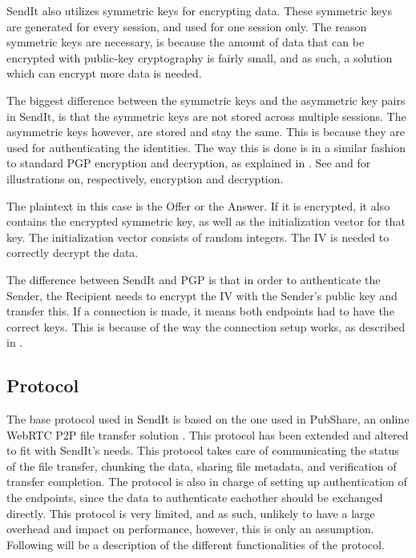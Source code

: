 	SendIt also utilizes symmetric keys for encrypting data. These symmetric keys are generated for every session, and used for one session only. The reason symmetric keys are necessary, is because the amount of data that can be encrypted with public-key cryptography is fairly small, and as such, a solution which can encrypt more data is needed.

	The biggest difference between the symmetric keys and the asymmetric key pairs in SendIt, is that the symmetric keys are not stored across multiple sessions. The asymmetric keys however, are stored and stay the same. This is because they are used for authenticating the identities. The way this is done is in a similar fashion to standard PGP encryption and decryption, as explained in . See  and  for illustrations on, respectively, encryption and decryption.

	The plaintext in this case is the Offer or the Answer. If it is encrypted, it also contains the encrypted symmetric key, as well as the initialization vector for that key. The initialization vector consists of random integers. The IV is needed to correctly decrypt the data. 

	The difference between SendIt and PGP is that in order to authenticate the Sender, the Recipient needs to encrypt the IV with the Sender's public key and transfer this. If a connection is made, it means both endpoints had to have the correct keys. This is because of the way the connection setup works, as described in .

	\subsection{Protocol}
	The base protocol used in SendIt is based on the one used in PubShare, an online WebRTC P2P file transfer solution \cite{url_pubshare}. This protocol has been extended and altered to fit with SendIt's needs. This protocol takes care of communicating the status of the file transfer, chunking the data, sharing file metadata, and verification of transfer completion. The protocol is also in charge of setting up authentication of the endpoints, since the data to authenticate eachother should be exchanged directly. This protocol is very limited, and as such, unlikely to have a large overhead and impact on performance, however, this is only an assumption. Following will be a description of the different functionalities of the protocol.

